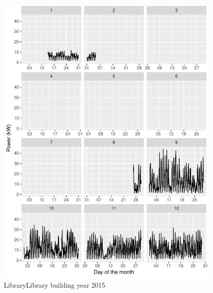 \documentclass[11pt, oneside]{article}   	%
\begin{document}
\begin{figure}
\includegraphics[keepaspectratio]{library_build_Y2015.pdf}
\caption{LibraryLibrary building year 2015 }
\end{figure}
\end{document}
